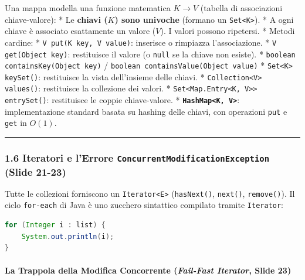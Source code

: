\documentclass[11pt,a4paper]{article}
\newcommand{\passthrough}[1]{#1}
\begin{document}
Una mappa modella una funzione matematica \(K \to V\) (tabella di
associazioni chiave-valore): * Le \textbf{chiavi (\(K\)) sono univoche}
(formano un \passthrough{\lstinline!Set<K>!}). * A ogni chiave è
associato esattamente un valore (\(V\)). I valori possono ripetersi. *
Metodi cardine: * \passthrough{\lstinline!V put(K key, V value)!}:
inserisce o rimpiazza l'associazione. *
\passthrough{\lstinline!V get(Object key)!}: restituisce il valore (o
\passthrough{\lstinline!null!} se la chiave non esiste). *
\passthrough{\lstinline!boolean containsKey(Object key)!} /
\passthrough{\lstinline!boolean containsValue(Object value)!} *
\passthrough{\lstinline!Set<K> keySet()!}: restituisce la vista
dell'insieme delle chiavi. *
\passthrough{\lstinline!Collection<V> values()!}: restituisce la
collezione dei valori. *
\passthrough{\lstinline!Set<Map.Entry<K, V>> entrySet()!}: restituisce
le coppie chiave-valore. *
\textbf{\passthrough{\lstinline!HashMap<K, V>!}}: implementazione
standard basata su hashing delle chiavi, con operazioni
\passthrough{\lstinline!put!} e \passthrough{\lstinline!get!} in
\textbf{\(O(1)\)}.

\begin{center}\rule{0.5\linewidth}{0.5pt}\end{center}

\subsubsection{\texorpdfstring{1.6 Iteratori e l'Errore
\texttt{ConcurrentModificationException} (Slide
21-23)}{1.6 Iteratori e l'Errore ConcurrentModificationException (Slide 21-23)}}\label{iteratori-e-lerrore-concurrentmodificationexception-slide-21-23}

Tutte le collezioni forniscono un \passthrough{\lstinline!Iterator<E>!}
(\passthrough{\lstinline!hasNext()!}, \passthrough{\lstinline!next()!},
\passthrough{\lstinline!remove()!}). Il ciclo
\passthrough{\lstinline!for-each!} di Java è uno zucchero sintattico
compilato tramite \passthrough{\lstinline!Iterator!}:

\begin{lstlisting}[language=Java]
for (Integer i : list) {
    System.out.println(i);
}
\end{lstlisting}

\paragraph{\texorpdfstring{La Trappola della Modifica Concorrente
(\emph{Fail-Fast Iterator}, Slide
23)}{La Trappola della Modifica Concorrente (Fail-Fast Iterator, Slide 23)}}\label{la-trappola-della-modifica-concorrente-fail-fast-iterator-slide-23}
\end{document}
